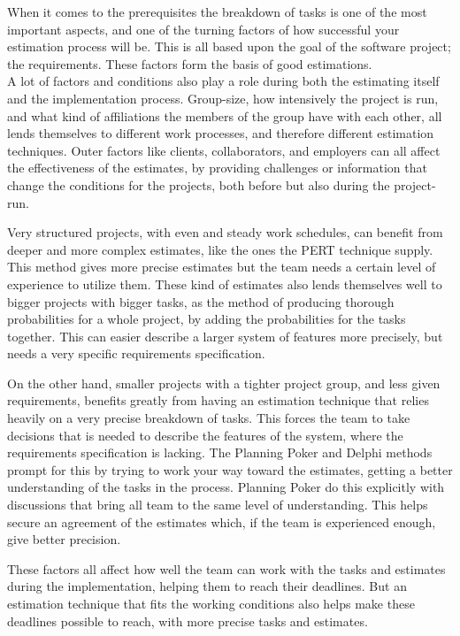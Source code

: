 When it comes to the prerequisites the breakdown of tasks is one of the most important aspects, and one of the turning factors of how successful your estimation process will be. This is all based upon the goal of the software project; the requirements. These factors form the basis of good estimations.\\

A lot of factors and conditions also play a role during both the estimating itself and the implementation process. Group-size, how intensively the project is run, and what kind of affiliations the members of the group have with each other, all lends themselves to different work processes, and therefore different estimation techniques. Outer factors like clients, collaborators, and employers can all affect the effectiveness of the estimates, by providing challenges or information that change the conditions for the projects, both before but also during the project-run. 

Very structured projects, with even and steady work schedules, can benefit from deeper and more complex estimates, like the ones the PERT technique supply. This method gives more precise estimates but the team needs a certain level of experience to utilize them. These kind of estimates also lends themselves well to bigger projects with bigger tasks, as the method of producing thorough probabilities for a whole project, by adding the probabilities for the tasks together. This can easier describe a larger system of features more precisely, but needs a very specific requirements specification.

On the other hand, smaller projects with a tighter project group, and less given requirements, benefits greatly from having an estimation technique that relies heavily on a very precise breakdown of tasks. This forces the team to take decisions that is needed to describe the features of the system, where the requirements specification is lacking. The Planning Poker and Delphi methods prompt for this by trying to work your way toward the estimates, getting a better understanding of the tasks in the process. Planning Poker do this explicitly with discussions that bring all team to the same level of understanding. This helps secure an agreement of the estimates which, if the team is experienced enough, give better precision.

These factors all affect how well the team can work with the tasks and estimates during the implementation, helping them to reach their deadlines. But an estimation technique that fits the working conditions also helps make these deadlines possible to reach, with more precise tasks and estimates.\\

